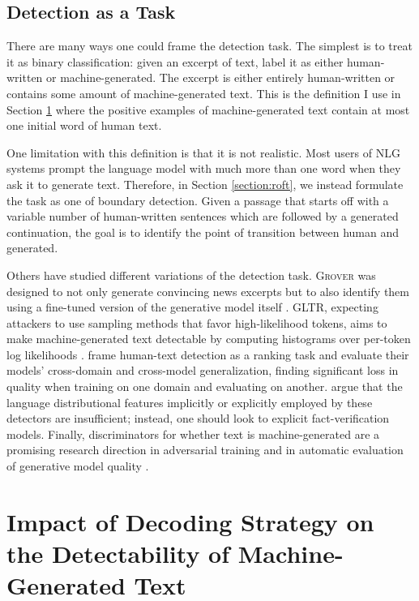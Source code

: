 \subsection{Detection as a Task}
There are many ways one could frame the detection task.
The simplest is to treat it as binary classification: given an excerpt of text, label it as either human-written or machine-generated.
The excerpt is either entirely human-written or contains some amount of machine-generated text.
This is the definition I use in Section \ref{section:detection} where the positive examples of machine-generated text contain at most one initial word of human text.

One limitation with this definition is that it is not realistic.
Most users of NLG systems prompt the language model with much more than one word when they ask it to generate text.
Therefore, in Section \ref{section:roft}, we instead formulate the task as one of boundary detection.
Given a passage that starts off with a variable number of human-written sentences which are followed by a generated continuation, the goal is to identify the point of transition between human and generated.

Others have studied different variations of the detection task.
\textsc{Grover} was designed to not only generate convincing news excerpts but to also identify them using a fine-tuned version of the generative model itself \citep{zellers2019defending}.
GLTR, expecting attackers to use sampling methods that favor high-likelihood tokens, aims to make machine-generated text detectable by computing histograms over per-token log likelihoods \citep{gehrmann2019gltr}.
\citet{bakhtin2019real} frame human-text detection as a ranking task and evaluate their models' cross-domain and cross-model generalization, finding significant loss in quality when training on one domain and evaluating on another.
\citet{schuster2019we} argue that the language distributional features implicitly or explicitly employed by these detectors are insufficient; instead, one should look to explicit fact-verification models.
Finally, discriminators for whether text is machine-generated are a promising research  direction in adversarial training \citep{lin2017adversarial,li2017adversarial} and in automatic evaluation of generative model quality \citep{novikova2017we,kannan2017adversarial,lowe2017towards}. 


\section{Impact of Decoding Strategy on the Detectability of Machine-Generated Text}
\label{section:detection}

